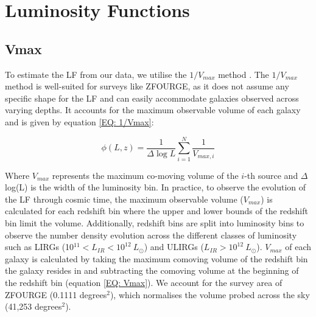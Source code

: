\section{Luminosity Functions} \label{Sec: Luminosity Functions}
\subsection{Vmax} \label{Sec: Vmax}
To estimate the LF from our data, we utilise the $1/V_{max}$ method \citep{schmidt_space_1968}. The $1/V_{max}$ method is well-suited for surveys like ZFOURGE, as it does not assume any specific shape for the LF and can easily accommodate galaxies observed across varying depths. It accounts for the maximum observable volume of each galaxy and is given by equation \ref{EQ: 1/Vmax}:

\begin{equation} \label{EQ: 1/Vmax}
    \phi(L,z) = \frac{1}{\Delta \log L}\sum_{i=1}^N \frac{1}{V_{max,i}}
\end{equation}

Where $V_{max}$ represents the maximum co-moving volume of the $i$-th source and $\Delta$ log(L) is the width of the luminosity bin. In practice, to observe the evolution of the LF through cosmic time, the maximum observable volume ($V_{max}$) is calculated for each redshift bin where the upper and lower bounds of the redshift bin limit the volume. Additionally, redshift bins are split into luminosity bins to observe the number density evolution across the different classes of luminosity such as LIRGs (10$^{11} < L_{IR} < 10^{12}\ L_{\odot}$) and ULIRGs ($L_{IR} > 10^{12}\ L_{\odot}$). $V_{max}$ of each galaxy is calculated by taking the maximum comoving volume of the redshift bin the galaxy resides in and subtracting the comoving volume at the beginning of the redshift bin (equation \ref{EQ: Vmax}). We account for the survey area of ZFOURGE (0.1111 degrees$^2$), which normalises the volume probed across the sky (41,253 degrees$^2$). 

